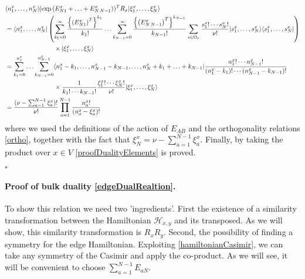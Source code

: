 \documentclass[10pt]{article}
\numberwithin{equation}{section}
\numberwithin{equation}{subsection}
\begin{document}
\begin{align}
&\langle n_{1}^{x},\ldots,n_{N}^{x}|(\exp{(E_{N1}^{x}+\ldots+E_{N\,N-1}^{x})})^{T}R_{x}|\xi_{1}^{x},\ldots,\xi_{N}^{x}\rangle\nonumber\\&= \langle  n_{1}^{x},\ldots,n_{N}^{x}|\left(\sum_{k_{1}=0}^{\infty}\frac{\left\{\left(E_{N1}^{x}\right)^{T}\right\}^{k_{1}}}{k_{1}!}\ldots\sum_{k_{N-1}=0}^{\infty}\frac{\left\{\left(E_{N\,N-1}^{x}\right)^{T}\right\}^{k_{N-1}}}{k_{N-1}!}\sum_{s\in\Omega_{x}}\frac{s_{1}^{x}!\cdots s_{N}^{x}!}{\nu!}|s_{1}^{x},\ldots,s_{N}^{x}\rangle\langle s_{1}^{x},\ldots,s_{N}^{x}|\right)\nonumber
\\&
\hspace{2.cm}\qquad\times |\xi_{1}^{x},\ldots,\xi_{N}^{x}\rangle\nonumber
\\&=
\sum_{k_{1}=0}^{n_{1}^{x}}\ldots\sum_{k_{N-1}=0}^{n_{N-1}^{x}}\langle n_{1}^{x}-k_{1},\ldots,n_{N-1}^{x}-k_{N-1},\ldots,n_{N}^{x}+k_{1}+\ldots+k_{N-1}|\frac{n_{1}^{x}!\cdots n_{N-1}^{x}!}{(n_{1}^{x}-k_{1})!\cdots(n_{N-1}^{x}-k_{N-1})!}\nonumber
\\& 
\hspace{2.cm}\qquad\times \frac{1}{k_{1}!\cdots k_{N-1}!}\frac{\xi_{1}^{x}!\cdots \xi_{N}^{x}!}{\nu!}|\xi_{1}^{x},\ldots,\xi_{N}^{x}\rangle\nonumber
\\&=
\frac{(\nu-\sum_{a=1}^{N-1}\xi_{a}^{x})!}{\nu!}\prod_{a=1}^{N-1}\frac{n_{a}^{x}!}{(n_{a}^{x}-\xi_{a}^{x})!}
\end{align}
where we used the definitions of the action of $E_{AB}$  and the orthogonality relations \eqref{ortho}, together with the fact that $\xi_{N}^{x}=\nu-\sum_{a=1}^{N-1}\xi_{a}^{x}$. 
Finally, by taking the product over $x\in V$ \eqref{proofDualityElements} is proved.
\begin{flushright}
    $\square$
\end{flushright}


\paragraph{Proof of bulk duality \eqref{edgeDualRealtion}.}To show this relation we need two 'ingredients'. First the existence of a similarity transformation between the Hamiltonian $\mathcal{H}_{x,y}$  and its transposed. As we will show, this similarity transformation is $R_{x}R_{y}$.  Second, the possibility of finding a symmetry for the edge Hamiltonian. Exploiting \eqref{hamiltonianCasimir}, we can take any symmetry of the Casimir and apply the co-product. As we will see, it will be convenient to choose $\sum_{a=1}^{N-1}E_{aN}$. 
\end{document}
